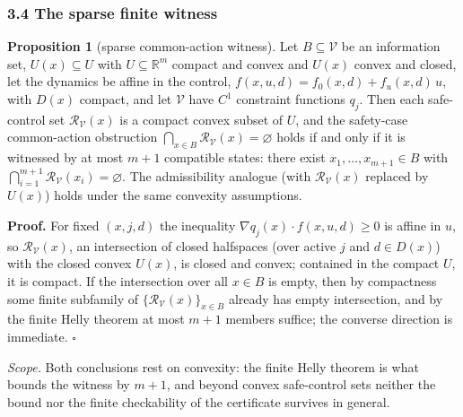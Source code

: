 \documentclass[10pt,twocolumn]{article}
\theoremstyle{definition}
\newtheorem{proposition}{Proposition}
\begin{document}
\subsubsection{3.4 The sparse finite
witness}\label{calc-the-sparse-finite-witness}

\begin{proposition}[sparse common-action witness]\label{calc-prop:helly}
Let \(B\subseteq\mathcal V\) be an information set, \(U(x)\subseteq U\)
with \(U\subseteq\mathbb R^m\) compact and convex and \(U(x)\) convex and
closed, let the dynamics be affine in the control,
\(f(x,u,d)=f_0(x,d)+f_u(x,d)\,u\), with \(D(x)\) compact, and let
\(\mathcal V\) have \(C^1\) constraint functions \(q_j\). Then each
safe-control set \(\mathcal R_{\mathcal V}(x)\) is a compact convex
subset of \(U\), and the safety-case common-action obstruction
\(\bigcap_{x\in B}\mathcal R_{\mathcal V}(x)=\varnothing\) holds if and
only if it is witnessed by at most \(m+1\) compatible states: there
exist \(x_1,\dots,x_{m+1}\in B\) with
\(\bigcap_{i=1}^{m+1}\mathcal R_{\mathcal V}(x_i)=\varnothing\). The
admissibility analogue (with \(\mathcal R_{\mathcal V}(x)\) replaced by
\(U(x)\)) holds under the same convexity assumptions.
\end{proposition}

\textbf{Proof.} For fixed \((x,j,d)\) the inequality
\(\nabla q_j(x)\cdot f(x,u,d)\ge 0\) is affine in \(u\), so
\(\mathcal R_{\mathcal V}(x)\), an intersection of closed halfspaces
(over active \(j\) and \(d\in D(x)\)) with the closed convex \(U(x)\),
is closed and convex; contained in the compact \(U\), it is compact. If
the intersection over all \(x\in B\) is empty, then by compactness some
finite subfamily of \(\{\mathcal R_{\mathcal V}(x)\}_{x\in B}\) already
has empty intersection, and by the finite Helly theorem at most \(m+1\)
members suffice; the converse direction is immediate. \hfill\(\square\)

\emph{Scope.} Both conclusions rest on convexity: the finite Helly theorem is what bounds the witness by \(m+1\), and beyond convex safe-control sets neither the bound nor the finite checkability of the certificate survives in general.
\end{document}
